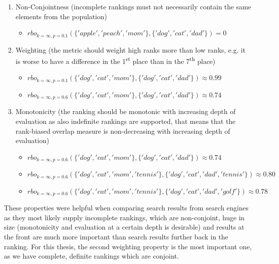 \documentclass[draft,final]{thesisclass} %
\begin{document}
\begin{enumerate}
\item Non-Conjointness (incomplete rankings must not necessarily contain the same elements from the population)
\begin{itemize}
    \item $rbo_{k=\infty,p=0.1}(\{'apple','peach','mom'\},\{'dog','cat','dad'\}) = 0$
\end{itemize}
\item Weighting (the metric should weight high ranks more than low ranks, e.g. it is worse to have a difference in the 1\textsuperscript{st} place than in the 7\textsuperscript{th} place)
\begin{itemize}
    \item $rbo_{k=\infty,p=0.1}(\{'dog','cat','mom'\},\{'dog','cat','dad'\}) \approx 0.99$
    \item $rbo_{k=\infty,p=0.6}(\{'dog','cat','mom'\},\{'dog','cat','dad'\}) \approx 0.74$
\end{itemize}
\item Monotonicity (the ranking should be monotonic with increasing depth of evaluation as also indefinite rankings are supported, that means that the rank-biased overlap measure is non-decreasing with increasing depth of evaluation)
\begin{itemize}
    \item $rbo_{k=\infty,p=0.6}(\{'dog','cat','mom'\},\{'dog','cat','dad'\}) \approx 0.74$
    \item $rbo_{k=\infty,p=0.6}(\{'dog','cat','mom','tennis'\},\{'dog','cat','dad','tennis'\}) \approx 0.80$
    \item $rbo_{k=\infty,p=0.6}(\{'dog','cat','mom','tennis'\},\{'dog','cat','dad','golf'\}) \approx 0.78$
\end{itemize}
\end{enumerate}
These properties were helpful when comparing search results from search engines as they most likely supply incomplete rankings, which are non-conjoint, huge in size (monotonicity and evaluation at a certain depth is desirable) and results at the front are much more important than search results further back in the ranking.
For this thesis, the second weighting property is the most important one, as we have complete, definite rankings which are conjoint.
\end{document}
